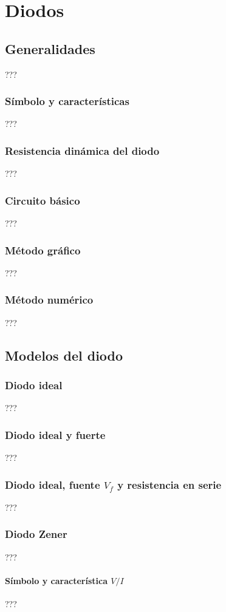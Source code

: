 
\chapter{Diodos}
\section{Generalidades}
???
\subsection{Símbolo y características}
???
\subsection{Resistencia dinámica del diodo}
???
\subsection{Circuito básico}
???
\subsection{Método gráfico}
???
\subsection{Método numérico}
???
\section{Modelos del diodo}
\subsection{Diodo ideal}
???
\subsection{Diodo ideal y fuerte}
???
\subsection{Diodo ideal, fuente $V_f$ y resistencia en serie}
???
\subsection{Diodo Zener}
???
\subsubsection{Símbolo y característica $V/I$}
???
